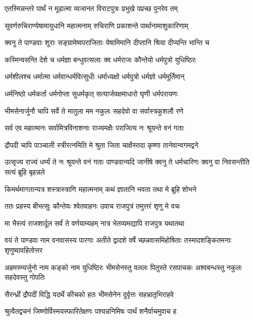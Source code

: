 \twolineshloka
{एतस्मिन्नन्तरे पार्थं न मूढात्मा व्यजानत}
{विराटपुत्रः प्रभुखे पप्रच्छ पुनरेव तम्}


\twolineshloka
{सुवर्णरुचिराण्येषामायुधानि महात्मनाम्}
{रुचिराणि प्रकाशन्ते पार्थानामाशुकारिणाम्}


\twolineshloka
{क्वनु ते पाण्डवाः शूराः सङ्ग्रामेष्वपराजिताः}
{येषामिमानि दीप्तानि श्रिया दीप्यन्ति भान्ति च}



\twolineshloka
{कस्मिन्वसन्ति देशे च धर्मज्ञा बन्धुवत्सलाः}
{क्व धर्मराजः कौन्तेयो धर्मपुत्रो युधिष्ठिरः}


\twolineshloka
{धर्मशीलश्च धर्मात्मा धर्मवान्धर्मवित्सुधीः}
{धर्माध्यक्षो धर्मपुत्रो धर्मज्ञो धर्ममूर्तिमान्}


\twolineshloka
{धर्मनिष्ठो धर्मकर्ता धर्मगोप्ता सुधर्मकृत्}
{सत्यार्जवक्षमाधारो घृणी धर्मपरायणः}


\twolineshloka
{भीमसेनार्जुनौ चापि सर्वे ते मातुला मम}
{नकुलः सहदेवो वा सर्वास्त्रकुशलौ रणे}


\twolineshloka
{सर्व एव महात्मानः सर्वामित्रविनाशनाः}
{राज्यमक्षैः पराजित्य नः श्रूयन्ते वनं गताः}


\twolineshloka
{द्रौपदी चापि पाञ्चाली स्त्रीरत्नमिति मे श्रुता}
{जिता चाक्षैस्तदा कृष्णा तानेवान्वगमद्वने}


\onelineshloka
{उत्सृज्य राज्यं धर्म्यं ते नः श्रूयन्ते वनं गताः}
\twolineshloka
{पाण्डवान्यदि जानीषे क्वनु ते धर्मचारिणः}
{क्वनु वा निवसन्तीति सत्यं ब्रूहि बृहन्नले}


\twolineshloka
{किमर्थमागतान्यत्र शस्त्रास्त्राणि महात्मनाम्}
{कथं ज्ञातानि भवता तथा मे ब्रूहि शोभने}



\twolineshloka
{ततः प्रहस्य बीभत्सुः कौन्तेयः श्वेतवाहनः}
{उवाच राजपुत्रं तमुत्तरं शृणु मे वचः}


\twolineshloka
{मा भैस्त्वं राजशार्दूल सर्वं ते वर्णयाम्यहम्}
{नात्र भेतव्यमद्यापि राजपुत्र यथातथा}


\threelineshloka
{वयं ते पाण्डवा नाम वनवासस्य पारगाः}
{अतीते द्वादशे वर्षे च्छन्नवासमिहोषिताः}
{तस्मादशङ्कितमनाः शृणुष्वावहितोत्तर}


\threelineshloka
{अहमस्म्यर्जुनो नाम कङ्को नाम युधिष्ठिरः}
{भीमसेनस्तु वललः पितुस्ते रसपाचकः}
{अश्वबन्धस्तु नकुलः सहदेवस्तु गोपतिः}


\twolineshloka
{सैरन्ध्रीं द्रौपदीं विद्धि यदर्थे कीचको हतः}
{भीमसेनेन दुर्वृत्तः सहभ्रातृभिराहवे}


\twolineshloka
{श्रुत्वैतद्वचनं जिष्णोर्विस्मयस्फारितेक्षणः}
{पश्यन्ननिमिषः पार्थं शनैर्वाचमुवाच ह}

